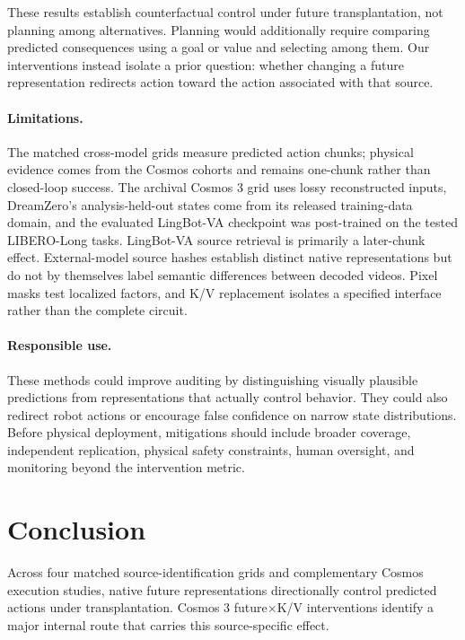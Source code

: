 These results establish counterfactual control under future transplantation, not planning among alternatives. Planning would additionally require comparing predicted consequences using a goal or value and selecting among them. Our interventions instead isolate a prior question: whether changing a future representation redirects action toward the action associated with that source.

\paragraph{Limitations.}
The matched cross-model grids measure predicted action chunks; physical evidence comes from the Cosmos cohorts and remains one-chunk rather than closed-loop success. The archival Cosmos 3 grid uses lossy reconstructed inputs, DreamZero's analysis-held-out states come from its released training-data domain, and the evaluated LingBot-VA checkpoint was post-trained on the tested LIBERO-Long tasks. LingBot-VA source retrieval is primarily a later-chunk effect. External-model source hashes establish distinct native representations but do not by themselves label semantic differences between decoded videos. Pixel masks test localized factors, and K/V replacement isolates a specified interface rather than the complete circuit.

\paragraph{Responsible use.}
These methods could improve auditing by distinguishing visually plausible predictions from representations that actually control behavior. They could also redirect robot actions or encourage false confidence on narrow state distributions. Before physical deployment, mitigations should include broader coverage, independent replication, physical safety constraints, human oversight, and monitoring beyond the intervention metric.

\section{Conclusion}

Across four matched source-identification grids and complementary Cosmos execution studies, native future representations directionally control predicted actions under transplantation. Cosmos 3 future$\times$K/V interventions identify a major internal route that carries this source-specific effect.
